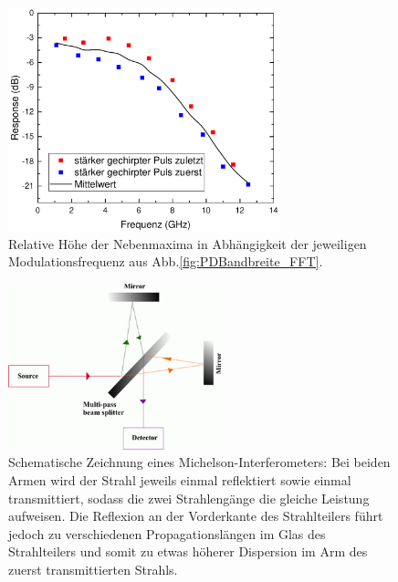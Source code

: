 \documentclass[bachelor,       %
               twoside,        %
               BCOR10mm,       %
               liststotoc,nomtotoc,bibtotoc, %
               english,ngerman, %
               final,          %
               ]{GAUBM}
\begin{document}
\begin{figure}[!htb]
	\centering
	\includegraphics[width=0.7\textwidth]{figures/PDBandwidth}
	\caption{Relative Höhe der Nebenmaxima in Abhängigkeit der jeweiligen Modulationsfrequenz aus Abb.\ref{fig:PDBandbreite_FFT}.}
	\label{fig:PDBandbreiteAusw}
\end{figure}

\begin{figure}[!htb]
	\centering
	\includegraphics[width=0.55\textwidth]{figures/multi_pass_beam_splitter.png}
	\caption{Schematische Zeichnung eines Michelson-Interferometers\protect\footnotemark:
	Bei beiden Armen wird der Strahl jeweils einmal reflektiert sowie einmal transmittiert, sodass die zwei Strahlengänge die gleiche Leistung aufweisen.
	Die Reflexion an der Vorderkante des Strahlteilers führt jedoch zu verschiedenen Propagationslängen im Glas des Strahlteilers und somit zu etwas höherer Dispersion im Arm des zuerst transmittierten Strahls.}
	\label{fig:Beamsplitter}
\end{figure}
\end{document}
